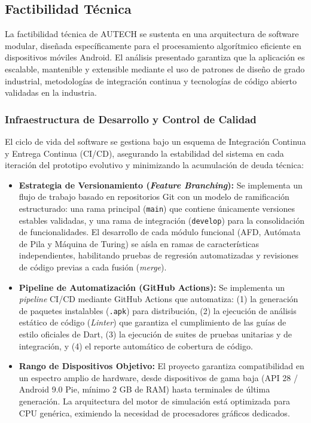 \subsection{Factibilidad Técnica}
\label{subsec:factibilidad_tecnica}

La factibilidad técnica de AUTECH se sustenta en una arquitectura de software modular, diseñada específicamente para el procesamiento algorítmico eficiente en dispositivos móviles Android. El análisis presentado garantiza que la aplicación es escalable, mantenible y extensible mediante el uso de patrones de diseño de grado industrial, metodologías de integración continua y tecnologías de código abierto validadas en la industria.

\subsubsection{Infraestructura de Desarrollo y Control de Calidad}

El ciclo de vida del software se gestiona bajo un esquema de Integración Continua y Entrega Continua (CI/CD), asegurando la estabilidad del sistema en cada iteración del prototipo evolutivo y minimizando la acumulación de deuda técnica:
\begin{itemize}
    \item \textbf{Estrategia de Versionamiento (\textit{Feature Branching}):} Se implementa un flujo de trabajo basado en repositorios Git con un modelo de ramificación estructurado: una rama principal (\texttt{main}) que contiene únicamente versiones estables validadas, y una rama de integración (\texttt{develop}) para la consolidación de funcionalidades. El desarrollo de cada módulo funcional (AFD, Autómata de Pila y Máquina de Turing) se aísla en ramas de características independientes, habilitando pruebas de regresión automatizadas y revisiones de código previas a cada fusión (\textit{merge}).
    \item \textbf{Pipeline de Automatización (GitHub Actions):} Se implementa un \textit{pipeline} CI/CD mediante GitHub Actions que automatiza: (1) la generación de paquetes instalables (\texttt{.apk}) para distribución, (2) la ejecución de análisis estático de código (\textit{Linter}) que garantiza el cumplimiento de las guías de estilo oficiales de Dart, (3) la ejecución de suites de pruebas unitarias y de integración, y (4) el reporte automático de cobertura de código.
    \item \textbf{Rango de Dispositivos Objetivo:} El proyecto garantiza compatibilidad en un espectro amplio de hardware, desde dispositivos de gama baja (API 28 / Android 9.0 Pie, mínimo 2 GB de RAM) hasta terminales de última generación. La arquitectura del motor de simulación está optimizada para CPU genérica, eximiendo la necesidad de procesadores gráficos dedicados.
\end{itemize}

